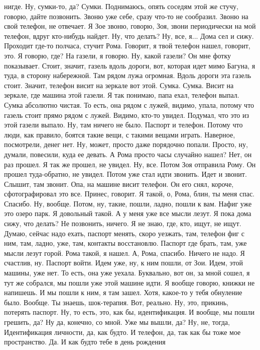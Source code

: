 нигде. Ну, сумки-то, да? Сумки. Поднимаюсь, опять соседям этой же стучу, говорю, дайте позвонить.
Звоню уже себе, сразу что-то не сообразил. Звоню на свой телефон, не отвечает. Я Зое звоню, говорю,
Зоя, звони периодически на мой телефон, вдруг кто-нибудь найдет. Ну, что делать? Ну, все, я...
Дома сел и сижу. Проходит где-то полчаса, стучит Рома. Говорит, я твой телефон нашел, говорит,
это. Я говорю, где? На газели, я говорю. Ну, какой газели? Он мне фотку показывает. Стоит, значит,
газель вдоль дороги, вот, которая идет мимо Багуна, я туда, в сторону набережной. Там рядом лужа
огромная. Вдоль дороги эта газель стоит. Значит, телефон висит на зеркале вот этой. Сумка. Сумка.
Висит на зеркале, где машина этой газели. Я так понимаю, папа ехал, телефон выпал. Сумка абсолютно
чистая. То есть, она рядом с лужей, видимо, упала, потому что газель стоит прямо рядом с лужей. Видимо,
кто-то увидел. Подумал, что это из этой газели выпало. Ну, там ничего не было. Паспорт и телефон.
Потому что люди, как правило, боятся такие вещи, с такими вещами играть. Наверное, посмотрели,
денег нет. Ну, может, просто даже порядочно попали. Просто, ну, думали, повесили, куда ее девать. А Рома
просто часы случайно нашел? Нет, он раз прошел. Я так же прошел, не увидел. Ну, все. Потом Зоя отправила
Рому. Он прошел туда-обратно, не увидел. Потом уже стал идти звонить. Идет и звонит. Слышит,
там звонит. Опа, на машине висит телефон. Он его снял, короче, сфотографировал это все. Принес,
говорит. Я такой, о, Рома, блин, ты меня спас. Спасибо. Ну, вообще. Потом, ну, такие, пошли, ладно, пошли к вам. Нафиг
уже это озеро парк. Я довольный такой. А у меня уже все мысли лезут. Я пока дома сижу, что делать? Не
позвонить, ничего. Я не знаю, где, кто, ищут, не ищут. Думаю, сейчас надо ехать, паспорт менять,
скоро уезжать, там, телефон фиг с ним, там, ладно, уже, там, контакты восстановлю. Паспорт где брать,
там, уже мысли лезут горой. Рома такой, я нашел. А, Рома, спасибо. Ничего не надо. Я счастлив, ну. Паспорт войти.
Идем уже, ну, к ним пошли, от Зои. Идем, этой машины, уже нет. То есть, она уже уехала. Буквально,
вот он, за мной сошел, я тут же собрался, мы пошли уже этой машине идти. Я вообще говорю, книжки не
напишешь. И мы пошли к ним, я там зашел. Хотя, какое-то у тебя обнуление было. Вообще. Ты знаешь,
шок-терапия. Вот, реально. Ну, это, прикинь, потерять паспорт. Ну, то есть, это, как бы,
идентификация. И вообще, мы пошли грешить, да? Ну да, конечно, со мной. Уже мы вышли, да? Ну, не, тогда,
Идентификация личности, да, как будто.
И телефон, да, так как бы тоже
мое пространство. Да. И как будто тебе в день рождения
